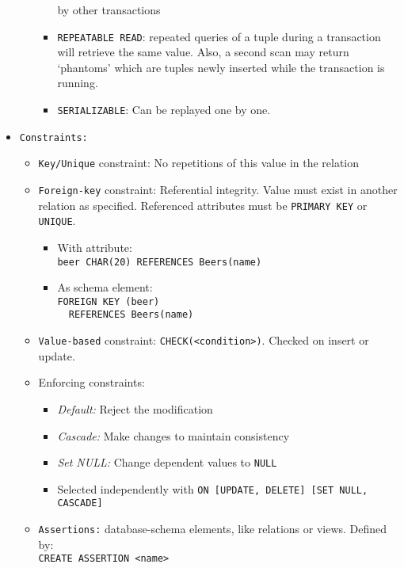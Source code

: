 \documentclass[landscape,8pt]{extarticle}
\newcommand{\code}{\lstinline}
\begin{document}
\begin{multicols}{4}
\begin{itemize}
\begin{itemize}
\begin{itemize}
        by other transactions
        \item \code{REPEATABLE READ}: repeated queries of a tuple during a transaction will retrieve
        the same value. Also, a second scan may return `phantoms' which are tuples newly inserted
        while the transaction is running.
        \item \code{SERIALIZABLE}: Can be replayed one by one.
    \end{itemize}
\end{itemize}
    \item \code{Constraints:}
    \begin{itemize}
        \item \code{Key/Unique} constraint: No repetitions of this value in the relation
        \item \code{Foreign-key} constraint: Referential integrity. Value must exist in another
        relation as specified. Referenced attributes must be \code{PRIMARY KEY} or \code{UNIQUE}.
        \begin{itemize}
            \item With attribute:\\
            \code{beer CHAR(20) REFERENCES Beers(name)}
            \item As schema element:\\
        \code{FOREIGN KEY (beer)}\\
        \code{  REFERENCES Beers(name)}
        \end{itemize}
        \item \code{Value-based} constraint: \code{CHECK(<condition>)}. Checked on insert or update.
        \item Enforcing constraints:
        \begin{itemize}
            \item \emph{Default:} Reject the modification
            \item \emph{Cascade:} Make changes to maintain consistency
            \item \emph{Set NULL:} Change dependent values to \code{NULL}
            \item Selected independently with \code{ON [UPDATE, DELETE] [SET NULL, CASCADE]}
        \end{itemize}
        \item \code{Assertions:} database-schema elements, like relations or views. Defined by:\\
        \code{CREATE ASSERTION <name>} \\

\end{itemize}
\end{itemize}
\end{multicols}
\end{document}
